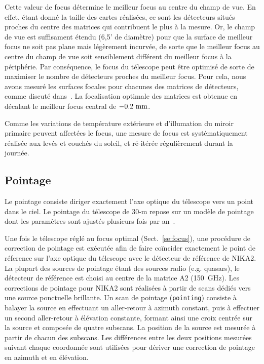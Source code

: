 Cette valeur de focus détermine le meilleur focus au centre du champ
de vue. En effet, étant donné la taille des cartes réalisées, ce sont
les détecteurs situés proches du centre des matrices qui contribuent le
plus à la mesure. Or, le champ de vue est suffisament étendu (6,5' de
diamètre) pour que la surface de meilleur focus ne soit pas plane mais
légèrement incurvée, de sorte que le meilleur focus au centre du champ
de vue soit sensiblement différent du meilleur focus à la
périphérie. Par conséquence, le focus du télescope peut être optimisé
de sorte de maximiser le nombre de détecteurs proches du meilleur
focus. Pour cela, nous avons mesuré les surfaces focales pour chacunes
des matrices de détecteurs, comme discuté dans~\citet{Perotto2019}. La
focalisation optimale des matrices est obtenue en décalant le meilleur
focus central de $-0.2~\rm{mm}$.

Comme les variations de température extérieure et d'illumation du
miroir primaire peuvent affectées le focus, une mesure de focus est
systématiquement réalisée aux levés et couchés du soleil, et ré-itérée
régulièrement durant la journée. 

\subsection{Pointage}
\label{se:pointing}

Le pointage consiste diriger exactement l'axe optique du
télescope vers un point dans le ciel. Le pointage du télescope de 30-m
repose sur un modèle de pointage dont les paramètres sont ajustés
plusieurs fois par an~\citep{Greve1996}. 

Une fois le télescope réglé au focus optimal (Sect.~\ref{se:focus}),
une procédure de correction de pointage est exécutée afin de faire
coïncider exactement le point de réference sur l'axe optique du
télescope avec le détecteur de référence de NIKA2. La plupart des
sources de pointage étant des sources radio (e.g. quasars), le
détecteur de référence est choisi au centre de la matrice A2
(150~GHz). Les corrections de pointage pour NIKA2 sont réalisées à
partir de scans dédiés vers une
source ponctuelle brillante. Un scan de pointage ({\tt pointing})
consiste à balayer la source en effectuant un aller-retour à azimuth
constant, puis à effectuer un second aller-retour à élévation
constante, formant ainsi une croix centrée sur la source et composée
de quatre subscans. La position de la source est mesurée à partir de
chacun des subscans. Les différences entre les deux positions mesurées
suivant chaque coordonnée sont utilisées pour dériver une
correction de pointage en azimuth et en élévation. 
 

